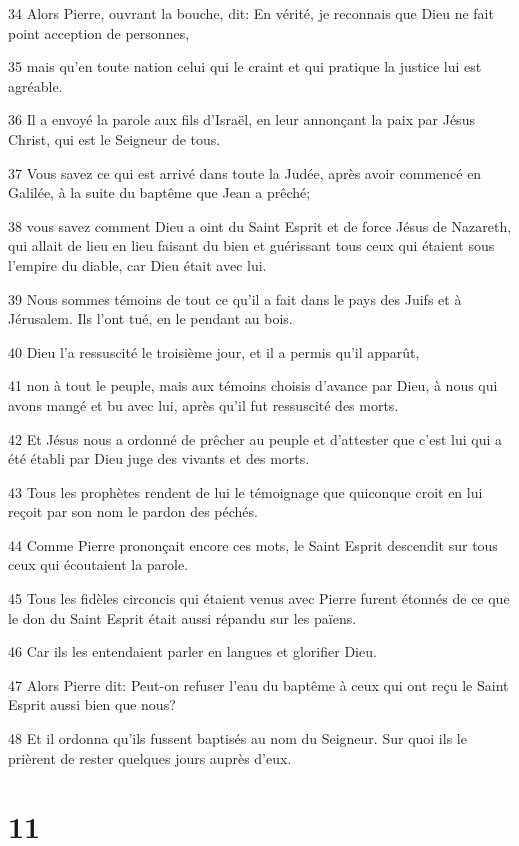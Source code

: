 \par 34 Alors Pierre, ouvrant la bouche, dit: En vérité, je reconnais que Dieu ne fait point acception de personnes,
\par 35 mais qu'en toute nation celui qui le craint et qui pratique la justice lui est agréable.
\par 36 Il a envoyé la parole aux fils d'Israël, en leur annonçant la paix par Jésus Christ, qui est le Seigneur de tous.
\par 37 Vous savez ce qui est arrivé dans toute la Judée, après avoir commencé en Galilée, à la suite du baptême que Jean a prêché;
\par 38 vous savez comment Dieu a oint du Saint Esprit et de force Jésus de Nazareth, qui allait de lieu en lieu faisant du bien et guérissant tous ceux qui étaient sous l'empire du diable, car Dieu était avec lui.
\par 39 Nous sommes témoins de tout ce qu'il a fait dans le pays des Juifs et à Jérusalem. Ils l'ont tué, en le pendant au bois.
\par 40 Dieu l'a ressuscité le troisième jour, et il a permis qu'il apparût,
\par 41 non à tout le peuple, mais aux témoins choisis d'avance par Dieu, à nous qui avons mangé et bu avec lui, après qu'il fut ressuscité des morts.
\par 42 Et Jésus nous a ordonné de prêcher au peuple et d'attester que c'est lui qui a été établi par Dieu juge des vivants et des morts.
\par 43 Tous les prophètes rendent de lui le témoignage que quiconque croit en lui reçoit par son nom le pardon des péchés.
\par 44 Comme Pierre prononçait encore ces mots, le Saint Esprit descendit sur tous ceux qui écoutaient la parole.
\par 45 Tous les fidèles circoncis qui étaient venus avec Pierre furent étonnés de ce que le don du Saint Esprit était aussi répandu sur les païens.
\par 46 Car ils les entendaient parler en langues et glorifier Dieu.
\par 47 Alors Pierre dit: Peut-on refuser l'eau du baptême à ceux qui ont reçu le Saint Esprit aussi bien que nous?
\par 48 Et il ordonna qu'ils fussent baptisés au nom du Seigneur. Sur quoi ils le prièrent de rester quelques jours auprès d'eux.

\chapter{11}

